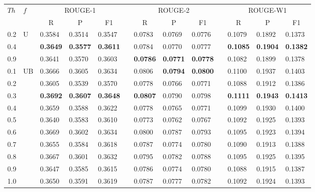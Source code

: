 \setlength{\tabcolsep}{4.5pt}
\begin{tabular*}{\textwidth}{@{\extracolsep{\fill}}lllllllllllll} 
\hline \hline
\multirow{2}{*}{$ Th $}	& \multirow{2}{*}{$ f $}	&\multicolumn{3}{c}{ROUGE-1}	&& \multicolumn{3}{c}{ROUGE-2}	&& \multicolumn{3}{c}{ROUGE-W1} \\
\cline{3-5} \cline{7-9} \cline{11-13}
	&& \multicolumn{1}{c}{R}		& \multicolumn{1}{c}{P}	& \multicolumn{1}{c}{F1}	&& \multicolumn{1}{c}{R}	& \multicolumn{1}{c}{P}	& \multicolumn{1}{c}{F1}	&& \multicolumn{1}{c}{R}	& \multicolumn{1}{c}{P}	& \multicolumn{1}{c}{F1} \\
\hline
0.2	& \multirow{3}{*}{U}	& 0.3584	& 0.3514	& 0.3547	&& 0.0783	& 0.0769	& 0.0776	&& 0.1079	& 0.1892	& 0.1373 \\
0.4	& 	& \textbf{0.3649}	& \textbf{0.3577}	& \textbf{0.3611}	&& 0.0784	& 0.0770	& 0.0777	&& \textbf{0.1085}	& \textbf{0.1904}	& \textbf{0.1382} \\
0.9	& 	& 0.3641	& 0.3570	& 0.3603	&& \textbf{0.0786}	& \textbf{0.0771}	& \textbf{0.0778}	&& 0.1082	& 0.1899	& 0.1378 \\
\hline
0.1	& \multirow{10}{*}{UB}	& 0.3666	& 0.3605	& 0.3634	&& 0.0806	& \textbf{0.0794}	& \textbf{0.0800}	&& 0.1100	& 0.1937	& 0.1403 \\
0.2	& 	& 0.3605	& 0.3539	& 0.3570	&& 0.0778	& 0.0766	& 0.0771	&& 0.1088	& 0.1912	& 0.1386 \\
0.3	& 	& \textbf{0.3692}	& \textbf{0.3607}	& \textbf{0.3648}	&& \textbf{0.0807}	& 0.0790	& 0.0798	&& \textbf{0.1111}	& \textbf{0.1943}	& \textbf{0.1413} \\
0.4	& 	& 0.3659	& 0.3588	& 0.3622	&& 0.0778	& 0.0765	& 0.0771	&& 0.1099	& 0.1930	& 0.1400 \\
0.5	& 	& 0.3640	& 0.3583	& 0.3610	&& 0.0773	& 0.0762	& 0.0767	&& 0.1092	& 0.1925	& 0.1393 \\
0.6	& 	& 0.3669	& 0.3602	& 0.3634	&& 0.0800	& 0.0787	& 0.0793	&& 0.1095	& 0.1923	& 0.1394 \\
0.7	& 	& 0.3655	& 0.3584	& 0.3618	&& 0.0787	& 0.0774	& 0.0780	&& 0.1090	& 0.1913	& 0.1388 \\
0.8	& 	& 0.3667	& 0.3601	& 0.3632	&& 0.0795	& 0.0782	& 0.0788	&& 0.1095	& 0.1925	& 0.1395 \\
0.9	& 	& 0.3647	& 0.3585	& 0.3615	&& 0.0786	& 0.0774	& 0.0780	&& 0.1088	& 0.1915	& 0.1387 \\
1.0	& 	& 0.3650	& 0.3591	& 0.3619	&& 0.0787	& 0.0777	& 0.0782	&& 0.1092	& 0.1924	& 0.1393 \\

\hline \hline
\end{tabular*}

